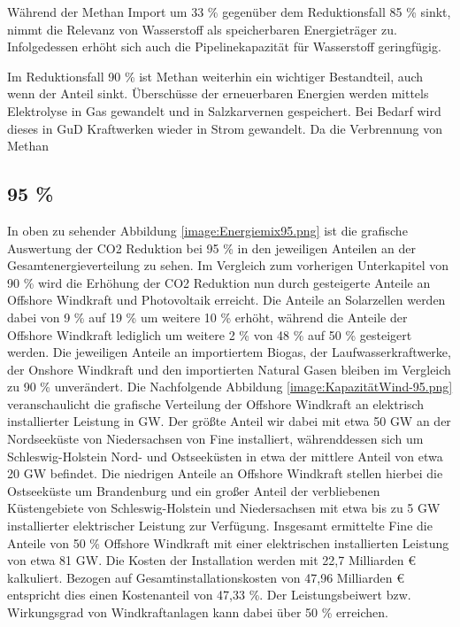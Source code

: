 Während der Methan Import um 33 \% gegenüber dem Reduktionsfall 85 \% sinkt, nimmt die Relevanz von Wasserstoff als speicherbaren Energieträger zu. Infolgedessen erhöht sich auch die Pipelinekapazität für Wasserstoff geringfügig. 

Im Reduktionsfall 90 \% ist Methan weiterhin ein wichtiger Bestandteil, auch wenn der Anteil sinkt. Überschüsse der erneuerbaren Energien werden mittels Elektrolyse in Gas gewandelt und in Salzkarvernen gespeichert. Bei Bedarf wird dieses in GuD Kraftwerken wieder in Strom gewandelt. Da die Verbrennung von Methan

\subsection{95 \%}


In oben zu sehender Abbildung \ref{image:Energiemix95.png} ist die grafische Auswertung der CO2 Reduktion bei 95 \% in den jeweiligen Anteilen an der Gesamtenergieverteilung zu sehen. Im Vergleich zum vorherigen Unterkapitel von 90 \% wird die Erhöhung der CO2 Reduktion nun durch gesteigerte Anteile an Offshore Windkraft und Photovoltaik erreicht. Die Anteile an Solarzellen werden dabei von 9 \% auf 19 \% um weitere 10 \% erhöht, während die Anteile der Offshore Windkraft lediglich um weitere 2 \% von 48 \% auf 50 \% gesteigert werden. Die jeweiligen Anteile an importiertem Biogas, der Laufwasserkraftwerke, der Onshore Windkraft und den importierten Natural Gasen bleiben im Vergleich zu 90 \% unverändert. 
Die Nachfolgende Abbildung \ref{image:KapazitätWind-95.png} veranschaulicht die grafische Verteilung der Offshore Windkraft an elektrisch installierter Leistung in GW. Der größte Anteil wir dabei mit etwa 50 GW an der Nordseeküste von Niedersachsen von Fine installiert, währenddessen sich um Schleswig-Holstein Nord- und Ostseeküsten in etwa der mittlere Anteil von etwa 20 GW befindet. Die niedrigen Anteile an Offshore Windkraft stellen hierbei die Ostseeküste um Brandenburg und ein großer Anteil der verbliebenen Küstengebiete von Schleswig-Holstein und Niedersachsen mit etwa bis zu 5 GW installierter elektrischer Leistung zur Verfügung. Insgesamt ermittelte Fine die Anteile von 50 \% Offshore Windkraft mit einer elektrischen installierten Leistung von etwa 81 GW. Die Kosten der Installation werden mit 22,7 Milliarden € kalkuliert. Bezogen auf Gesamtinstallationskosten von 47,96 Milliarden € entspricht dies einen Kostenanteil von 47,33  \%. Der Leistungsbeiwert bzw. Wirkungsgrad von Windkraftanlagen kann dabei über 50 \% erreichen.  

